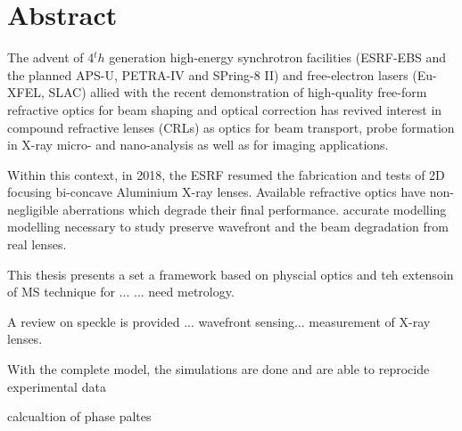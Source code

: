\chapter*{Abstract}
\label{sec:abstractEN}
\vspace*{-10mm}

The advent of 4$^th$ generation high-energy synchrotron facilities (ESRF-EBS and the planned APS-U, PETRA-IV and SPring-8 II) and free-electron lasers (Eu-XFEL, SLAC) allied with the recent demonstration of high-quality free-form refractive optics for beam shaping and optical correction has revived interest in compound refractive lenses (CRLs) as optics for beam transport, probe formation in X-ray micro- and nano-analysis as well as for imaging applications. 

Within this context, in 2018, the ESRF resumed the fabrication and tests of 2D focusing bi-concave Aluminium X-ray lenses. Available refractive optics have non-negligible aberrations which degrade their final performance. accurate modelling modelling necessary to study preserve wavefront and the beam degradation from real lenses.

This thesis presents a set a framework based on physcial optics and teh extensoin of MS technique for ... ... need metrology.

A review on speckle is provided ... wavefront sensing... measurement of X-ray lenses.

With the complete model, the simulations are done and are able to reprocide experimental data

calcualtion of phase paltes







